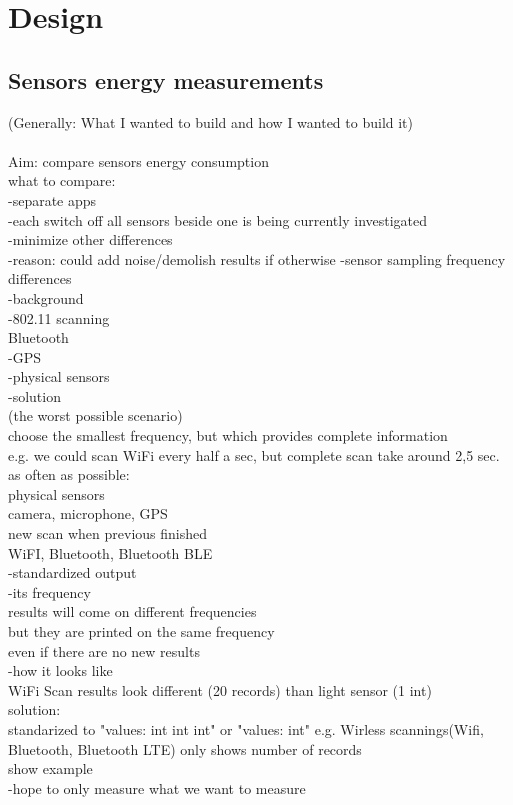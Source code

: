 \section{Design}
\label{s:design}
\subsection{Sensors energy measurements}

(Generally: What I wanted to build and how I wanted to build it)\\
\\
Aim: compare sensors energy consumption\\

what to compare:\\
	-separate apps\\
	-each switch off all sensors beside one is being currently investigated\\
	-minimize other differences \\
		-reason: could add noise/demolish results  if otherwise
		-sensor sampling frequency differences\\
			-background\\
				-802.11 scanning\\
					Bluetooth\\
				-GPS\\
				-physical sensors\\
			-solution\\
				(the worst possible scenario)\\
				choose the smallest frequency, but which provides complete information\\
					e.g. we could scan WiFi every half a sec, but complete scan take around 2,5 sec.\\
				as often as possible:\\
					physical sensors\\
					camera, microphone, GPS\\	
				new scan when previous finished\\
					WiFI, Bluetooth, Bluetooth BLE\\
		-standardized output\\
				-its frequency\\
					results will come on different frequencies\\
					but they are printed on the same frequency\\
						even if there are no new results\\
				-how it looks like\\
					WiFi Scan results look different (20 records) than light sensor (1 int)\\
					solution:\\
						standarized to "values: int int int" or "values: int"
							e.g. Wirless scannings(Wifi, Bluetooth, Bluetooth LTE) only shows number of records\\
							show example\\	
		-hope to only measure what we want to measure\\				
				
